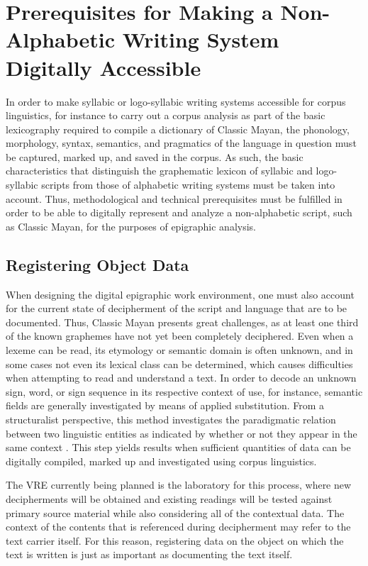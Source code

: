 \documentclass[amsthm,ebook]{saparticle}
\begin{document}
\section[Prerequisites for Making a Non{}-Alphabetic Writing System Digitally Accessible]{Prerequisites for
Making a Non-Alphabetic Writing System Digitally Accessible}
\noindent In order to make syllabic or logo-syllabic writing systems accessible for corpus linguistics, for instance to carry out
a corpus analysis as part of the basic lexicography required to compile a dictionary of Classic Mayan, the phonology,
morphology, syntax, semantics, and pragmatics of the language in question must be captured, marked up, and saved in the
corpus. As such, the basic characteristics that distinguish the graphematic lexicon of syllabic and logo-syllabic
scripts from those of alphabetic writing systems must be taken into account. Thus, methodological and technical
prerequisites must be fulfilled in order to be able to digitally represent and analyze a non-alphabetic script, such as
Classic Mayan, for the purposes of epigraphic analysis.

\subsection[Registering Object Data ]{Registering Object Data}
\noindent When designing the digital epigraphic work environment, one must also account for the current state of decipherment of
the script and language that are to be documented. Thus, Classic Mayan presents great challenges, as at least one third
of the known graphemes have not yet been completely deciphered. Even when a lexeme can be read, its etymology or
semantic domain is often unknown, and in some cases not even its lexical class can be determined, which causes
difficulties when attempting to read and understand a text. In order to decode an unknown sign, word, or sign sequence
in its respective context of use, for instance, semantic fields are generally investigated by means of applied
substitution. From a structuralist perspective, this method investigates the paradigmatic relation between two
linguistic entities as indicated by whether or not they appear in the same context \citep{Bußmann2002}. This step yields
results when sufficient quantities of data can be digitally compiled, marked up and investigated using corpus
linguistics. 

The VRE currently being planned is the laboratory for this process, where new decipherments will be obtained and
existing readings will be tested against primary source material while also considering all of the contextual data. The
context of the contents that is referenced during decipherment may refer to the text carrier itself. For this reason,
registering data on the object on which the text is written is just as important as documenting the text itself. 
\end{document}
